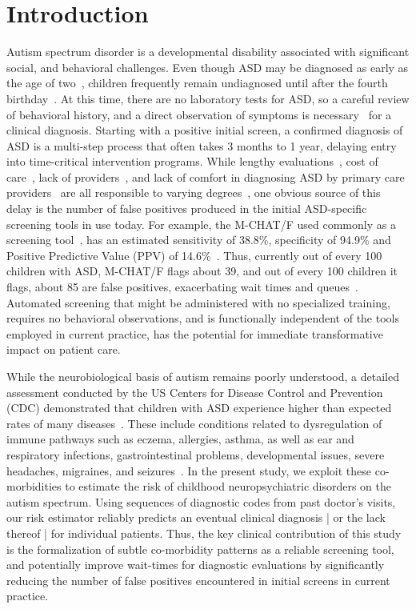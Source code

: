 \documentclass[onecolumn,10pt]{IEEEtran}
\begin{document}
\section*{Introduction}
%
Autism spectrum disorder is a developmental disability associated with significant social,  and behavioral challenges.
Even though ASD may be diagnosed as early as the  age of two~\cite{cdc},  children frequently remain undiagnosed  until after the fourth birthday~\cite{pmid24529515}. At this
time, there are no laboratory tests for ASD, so a careful review of behavioral history, and a direct
observation of symptoms is
necessary~\cite{volkmar2014practice,hyman2020identification} for a clinical diagnosis.  Starting with a positive initial screen, a confirmed diagnosis of ASD is a   multi-step process that often takes 3 months to 1 year,  delaying entry into time-critical intervention programs. While   lengthy evaluations~\cite{kalb2012determinants}, cost of care~\cite{bisgaier2011access},  lack of providers~\cite{fenikile2015barriers}, and lack of comfort in diagnosing ASD by primary care providers~\cite{fenikile2015barriers} are all responsible to varying degrees~\cite{gordon2016whittling}, one  obvious source of this delay is the number of false positives produced in the initial ASD-specific screening tools in use today. For example, the  M-CHAT/F used commonly as a screening tool~\cite{robins2014validation,hyman2020identification},  has an estimated  sensitivity of 38.8\%, specificity of 94.9\% and Positive Predictive Value (PPV) of 14.6\%~\cite{pmid31562252}. Thus,  currently  out of every 100 children with ASD,  M-CHAT/F flags about 39, and out of every 100 children it flags, about 85 are false positives, exacerbating  wait times and queues~\cite{gordon2016whittling}.  Automated   screening  that might be administered with  no specialized training, requires no behavioral observations, and is functionally independent of the tools employed in current practice,  has the potential for  immediate transformative  impact on patient care.


While the neurobiological basis of autism remains poorly understood,  a detailed assessment conducted by the US Centers for Disease Control and Prevention (CDC) demonstrated that  children with ASD experience  higher than expected rates of many diseases~\cite{cdc}. These include conditions related to dysregulation of immune pathways such as eczema, allergies, asthma, as well as ear and respiratory infections, gastrointestinal problems, developmental issues, severe headaches, migraines, and seizures~\cite{pmid30733689,pmid22511918}. In the present study, we exploit   these   co-morbidities to estimate the risk of  childhood neuropsychiatric disorders on the autism spectrum. Using sequences of diagnostic codes from past doctor's visits, our risk estimator reliably
predicts an eventual clinical  diagnosis | or the lack thereof |  for individual patients.
Thus, the key clinical  contribution of this study is the formalization  of subtle co-morbidity patterns as a reliable screening tool, and potentially  improve wait-times for diagnostic evaluations by significantly reducing the number of false positives encountered in initial screens in current practice.
\end{document}
